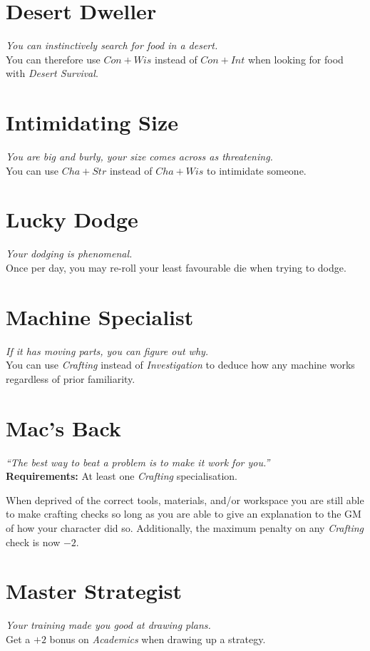 \section{Desert Dweller}
\textit{You can instinctively search for food in a desert.}\\
You can therefore use $Con + Wis$ instead of $Con + Int$ when looking for food with \textit{Desert Survival}.

\section{Intimidating Size}
\textit{You are big and burly, your size comes across as threatening.}\\
You can use $Cha + Str$ instead of $Cha + Wis$ to intimidate someone.

\section{Lucky Dodge}
\textit{Your dodging is phenomenal.}\\
Once per day, you may re-roll your least favourable die when trying to dodge.

\section{Machine Specialist}
\textit{If it has moving parts, you can figure out why.}\\
You can use \textit{Crafting} instead of \textit{Investigation} to deduce how any machine works regardless of prior familiarity.

\section{Mac's Back}
\textit{``The best way to beat a problem is to make it work for you.''}\\
\textbf{Requirements:} At least one \textit{Crafting} specialisation.

When deprived of the correct tools, materials, and/or workspace you are still able to make crafting checks so long as you are able to give an explanation to the GM of how your character did so.
Additionally, the maximum penalty on any \textit{Crafting} check is now $-2$.

\section{Master Strategist}
\textit{Your training made you good at drawing plans.}\\
Get a $+2$ bonus on \textit{Academics} when drawing up a strategy.

